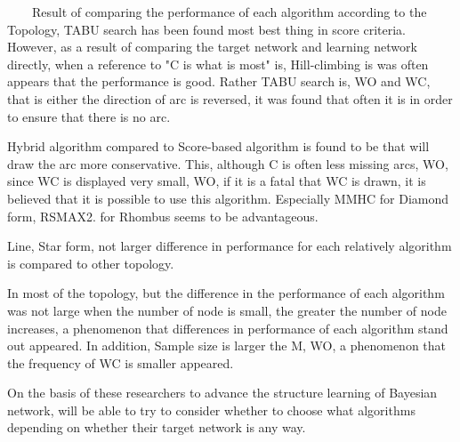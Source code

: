 ~~~~Result of comparing the performance of each algorithm according to the Topology, TABU search has been found most best thing in score criteria. However, as a result of comparing the target network and learning network directly, when a reference to "C is what is most" is, Hill-climbing is was often appears that the performance is good. Rather TABU search is, WO and WC, that is either the direction of arc is reversed, it was found that often it is in order to ensure that there is no arc.

Hybrid algorithm compared to Score-based algorithm is found to be that will draw the arc more conservative. This, although C is often less missing arcs, WO, since WC is displayed very small, WO, if it is a fatal that WC is drawn, it is believed that it is possible to use this algorithm. Especially MMHC for Diamond form, RSMAX2. for Rhombus seems to be advantageous.

Line, Star form, not larger difference in performance for each relatively algorithm is compared to other topology.

In most of the topology, but the difference in the performance of each algorithm was not large when the number of node is small, the greater the number of node increases, a phenomenon that differences in performance of each algorithm stand out appeared. In addition, Sample size is larger the M, WO, a phenomenon that the frequency of WC is smaller appeared.

On the basis of these researchers to advance the structure learning of Bayesian network, will be able to try to consider whether to choose what algorithms depending on whether their target network is any way.

